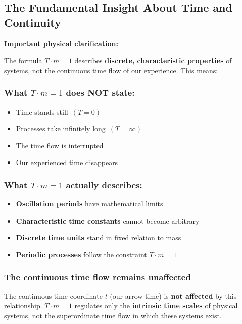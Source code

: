 	\subsection{The Fundamental Insight About Time and Continuity}
	
	\textbf{Important physical clarification:}
	
	The formula $T \cdot m = 1$ describes \textbf{discrete, characteristic properties} of systems, not the continuous time flow of our experience. This means:
	
	\subsubsection{What $T \cdot m = 1$ does NOT state:}
	\begin{itemize}
		\item \glqq Time stands still\grqq\ $(T = 0)$
		\item \glqq Processes take infinitely long\grqq\ $(T = \infty)$
		\item \glqq The time flow is interrupted\grqq
		\item \glqq Our experienced time disappears\grqq
	\end{itemize}
	
	\subsubsection{What $T \cdot m = 1$ actually describes:}
	\begin{itemize}
		\item \textbf{Oscillation periods} have mathematical limits
		\item \textbf{Characteristic time constants} cannot become arbitrary
		\item \textbf{Discrete time units} stand in fixed relation to mass
		\item \textbf{Periodic processes} follow the constraint $T \cdot m = 1$
	\end{itemize}
	
	\subsubsection{The continuous time flow remains unaffected}
	
	The continuous time coordinate $t$ (our \glqq arrow time\grqq) is \textbf{not affected} by this relationship. $T \cdot m = 1$ regulates only the \textbf{intrinsic time scales} of physical systems, not the superordinate time flow in which these systems exist.
	
